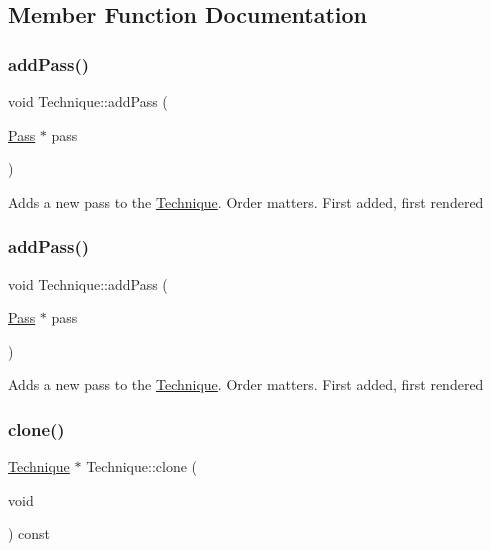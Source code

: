 \subsection{Member Function Documentation}
\mbox{\label{classTechnique_a6eba3e4ace1c907d900668bd0764e5cd}} 
\subsubsection{\texorpdfstring{add\+Pass()}{addPass()}\hspace{0.1cm}{\footnotesize\ttfamily [1/2]}}
{\footnotesize\ttfamily void Technique\+::add\+Pass (\begin{DoxyParamCaption}\item[{\hyperlink{classPass}{Pass} $\ast$}]{pass }\end{DoxyParamCaption})}

Adds a new pass to the \hyperlink{classTechnique}{Technique}. Order matters. First added, first rendered \mbox{\label{classTechnique_a6eba3e4ace1c907d900668bd0764e5cd}} 
\subsubsection{\texorpdfstring{add\+Pass()}{addPass()}\hspace{0.1cm}{\footnotesize\ttfamily [2/2]}}
{\footnotesize\ttfamily void Technique\+::add\+Pass (\begin{DoxyParamCaption}\item[{\hyperlink{classPass}{Pass} $\ast$}]{pass }\end{DoxyParamCaption})}

Adds a new pass to the \hyperlink{classTechnique}{Technique}. Order matters. First added, first rendered \mbox{\label{classTechnique_a2519656e5d79427781ec358ac346bb10}} 
\subsubsection{\texorpdfstring{clone()}{clone()}\hspace{0.1cm}{\footnotesize\ttfamily [1/2]}}
{\footnotesize\ttfamily \hyperlink{classTechnique}{Technique} $\ast$ Technique\+::clone (\begin{DoxyParamCaption}\item[{void}]{ }\end{DoxyParamCaption}) const}

